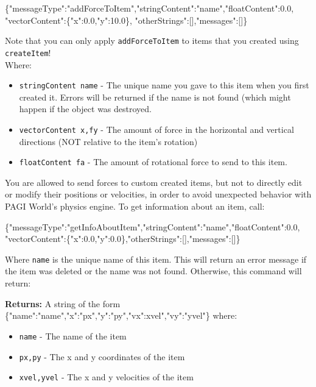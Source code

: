 \begin{center}
\scriptsize{\{"messageType":"addForceToItem","stringContent":"name","floatContent":0.0, "vectorContent":\{"x":0.0,"y":10.0\}, "otherStrings":[],"messages":[]\}} 
\end{center}
\noindent Note that you can only apply \texttt{addForceToItem} to items that you created using \texttt{createItem}!
\\Where:
\begin{itemize}
\item \texttt{stringContent name} - The unique name you gave to this item when you first created it. Errors will be returned if the name is not found (which might happen if the object was destroyed.
\item \texttt{vectorContent x,fy} - The amount of force in the horizontal and vertical directions (NOT relative to the item's rotation)
\item \texttt{floatContent fa} - The amount of rotational force to send to this item.
\end{itemize}

You are allowed to send forces to custom created items, but not to directly edit or modify their positions or velocities, in order to avoid unexpected behavior with PAGI World's physics engine. %
To get information about an item, call:
\begin{center}
	\scriptsize{\{"messageType":"getInfoAboutItem","stringContent":"name","floatContent":0.0, "vectorContent":\{"x":0.0,"y":0.0\},"otherStrings":[],"messages":[]\}}
\end{center}
Where \texttt{name} is the unique name of this item. This will return an error message if the item was deleted or the name was not found. Otherwise, this command will return:

\noindent \textbf{Returns:} A string of the form \scriptsize{\{"name":"name","x":"px","y":"py","vx":xvel","vy":"yvel"\}} where:

\begin{itemize}
\item \texttt{name} - The name of the item
\item \texttt{px,py} - The x and y coordinates of the item
\item \texttt{xvel,yvel} - The x and y velocities of the item
\end{itemize}

